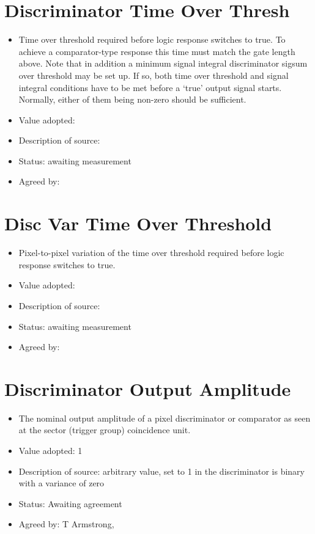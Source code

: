 \documentclass[GCT,short]{gct}
\begin{document}
\section{Discriminator Time Over Thresh}
\begin{itemize}
\item Time over threshold required before logic response switches to true. To achieve a comparator-type response this time must match the gate length above. Note that in addition a minimum signal integral discriminator sigsum over threshold may be set up. If so, both time over threshold and signal integral conditions have to be met before a ‘true’ output signal starts. Normally, either of them being non-zero should be sufficient.
\item Value adopted: 
\item Description of source: 
\item Status: \color{red}awaiting measurement\color{black}
\item Agreed by: 
\end{itemize}


\section{Disc Var Time Over Threshold}
\begin{itemize}
\item Pixel-to-pixel variation of the time over threshold required before logic response switches to true.
\item Value adopted: 
\item Description of source: 
\item Status: \color{red}awaiting measurement\color{black}
\item Agreed by: 
\end{itemize}


\section{Discriminator Output Amplitude}
\begin{itemize}
\item The nominal output amplitude of a pixel discriminator or comparator as seen at the sector (trigger group) coincidence unit.
\item Value adopted: 1
\item Description of source: arbitrary value, set to 1 in the discriminator is binary with a variance of zero
\item Status: \color{orange}Awaiting agreement\color{black}
\item Agreed by: T Armstrong, 
\end{itemize}
\end{document}

